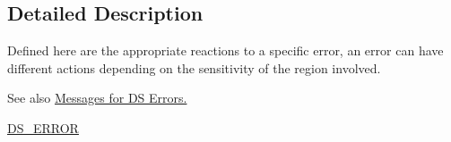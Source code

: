 \subsection{Detailed Description}
Defined here are the appropriate reactions to a specific error, an error can have different actions depending on the sensitivity of the region involved. \begin{DoxySeeAlso}{See also}
\hyperlink{group___m___d_s___messages}{Messages for DS Errors.} 

\hyperlink{_d_s_types_8h_a9a147727007f8945c5c0e8da3eb14229ae65d5c2844015910512fbbb1154b2e1d}{DS\_\-ERROR} 
\end{DoxySeeAlso}

